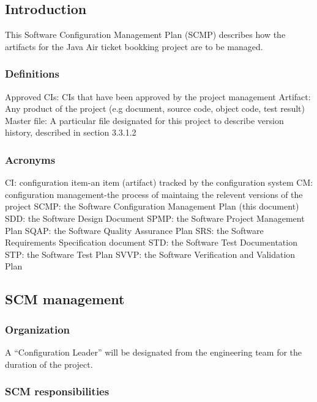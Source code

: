 \documentclass{scrartcl}
\begin{document}
\subsection{Introduction}
This Software Configuration Management Plan (SCMP) describes how the artifacts for the Java Air ticket bookking project are to be managed.
\subsubsection{Definitions}
Approved CIs: CIs that have been approved by the project management \newline
Artifact: Any product of the project (e.g document, source code, object code, test result) \newline
Master file: A particular file designated for this project to describe version history, described in section 3.3.1.2
\subsubsection{Acronyms}
CI: configuration item-an item (artifact) tracked by the configuration system \newline
CM: configuration management-the process of maintaing the relevent versions of the project \newline
SCMP: the Software Configuration Management Plan (this document)\newline
SDD: the Software Design Document \newline
SPMP: the Software Project Management Plan \newline
SQAP: the Software Quality Assurance Plan \newline
SRS: the Software Requirements Specification document \newline
STD: the Software Test Documentation \newline
STP: the Software Test Plan \newline
SVVP: the Software Verification and Validation Plan 
\subsection{SCM management}
\subsubsection{Organization}
A ``Configuration Leader'' will be designated from the engineering team for the duration of the project.
\subsubsection{SCM responsibilities}
\end{document}
